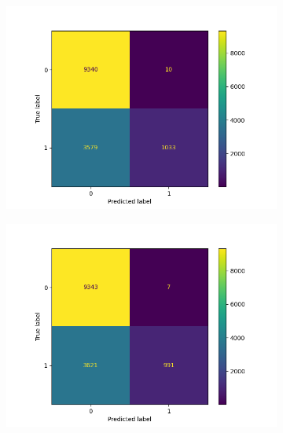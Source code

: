 \begin{figure}
\begin{subfigure}[b]{0.245\textwidth}
            \centering 
            \includegraphics[scale=0.35]{"../figs/fig_content_title/fig_KNN_3_content_title.png"}
            \caption{}
        \end{subfigure}
        \begin{subfigure}[b]{0.245\textwidth}
            \centering
            \includegraphics[scale=0.35]{"../figs/fig_content_title/fig_KNN_5_content_title.png"}
            \caption{}
        \end{subfigure}
        \begin{subfigure}[b]{0.245\textwidth}  
            \centering 

\end{subfigure}
\end{figure}
